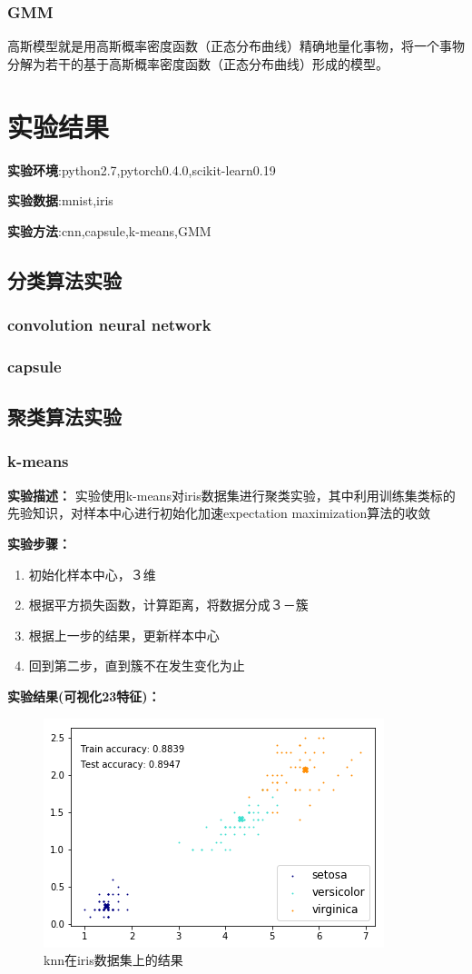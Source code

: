 \documentclass{article}
\begin{document}
	\subsubsection{GMM}
	高斯模型就是用高斯概率密度函数（正态分布曲线）精确地量化事物，将一个事物分解为若干的基于高斯概率密度函数（正态分布曲线）形成的模型。

\section{实验结果}
\textbf{实验环境}:python2.7,pytorch0.4.0,scikit-learn0.19

\textbf{实验数据}:mnist,iris

\textbf{实验方法}:cnn,capsule,k-means,GMM
\subsection{分类算法实验}
\subsubsection{convolution neural network}

\subsubsection{capsule}
\subsection{聚类算法实验}
\subsubsection{k-means}
\textbf{实验描述：}
实验使用k-means对iris数据集进行聚类实验，其中利用训练集类标的先验知识，对样本中心进行初始化加速expectation maximization算法的收敛

\textbf{实验步骤：}
\begin{enumerate}
\item 初始化样本中心，３维
\item 根据平方损失函数，计算距离，将数据分成３－簇
\item 根据上一步的结果，更新样本中心
\item 回到第二步，直到簇不在发生变化为止 
\end{enumerate}

\textbf{实验结果(可视化23特征)：}
\begin{figure}[htbp]
	\centering\includegraphics[scale=1.1]{knn_iris}
	\caption{knn在iris数据集上的结果}
\end{figure}
\end{document}
